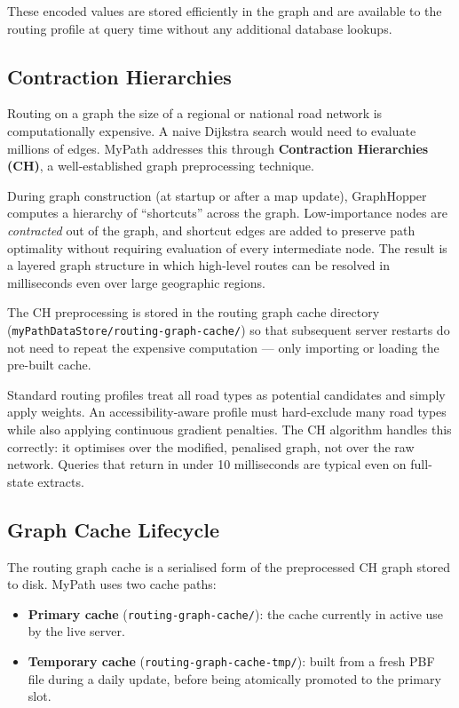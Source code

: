 \documentclass[12pt, a4paper]{report}
\begin{document}
These encoded values are stored efficiently in the graph and are available to the routing profile at query time without any additional database lookups.

\subsection{Contraction Hierarchies}
\label{subsec:ch}

Routing on a graph the size of a regional or national road network is computationally expensive. A naive Dijkstra search would need to evaluate millions of edges. MyPath addresses this through \textbf{Contraction Hierarchies (CH)}, a well-established graph preprocessing technique.

During graph construction (at startup or after a map update), GraphHopper computes a hierarchy of ``shortcuts'' across the graph. Low-importance nodes are \emph{contracted} out of the graph, and shortcut edges are added to preserve path optimality without requiring evaluation of every intermediate node. The result is a layered graph structure in which high-level routes can be resolved in milliseconds even over large geographic regions.

The CH preprocessing is stored in the routing graph cache directory (\texttt{myPathDataStore/routing-graph-cache/}) so that subsequent server restarts do not need to repeat the expensive computation — only importing or loading the pre-built cache.

\begin{infobox}
Standard routing profiles treat all road types as potential candidates and simply apply weights. An accessibility-aware profile must hard-exclude many road types while also applying continuous gradient penalties. The CH algorithm handles this correctly: it optimises over the modified, penalised graph, not over the raw network. Queries that return in under 10 milliseconds are typical even on full-state extracts.
\end{infobox}

\subsection{Graph Cache Lifecycle}
\label{subsec:cache}

The routing graph cache is a serialised form of the preprocessed CH graph stored to disk. MyPath uses two cache paths:

\begin{itemize}[leftmargin=*]
  \item \textbf{Primary cache} (\texttt{routing-graph-cache/}): the cache currently in active use by the live server.
  \item \textbf{Temporary cache} (\texttt{routing-graph-cache-tmp/}): built from a fresh PBF file during a daily update, before being atomically promoted to the primary slot.
\end{itemize}
\end{document}
